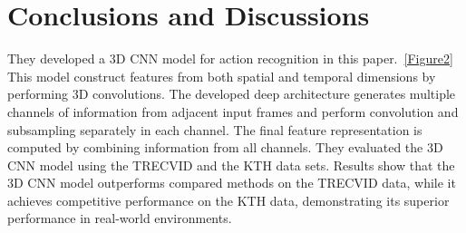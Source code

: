 \documentclass[10pt,twocolumn,letterpaper]{article}
\begin{document}
\section{Conclusions and Discussions}
They developed a 3D CNN model for action recognition in this paper.~\ref{Figure2} This model construct features from both spatial and temporal dimensions by performing 3D convolutions. The developed deep architecture generates multiple channels of information from adjacent input frames and perform convolution and subsampling separately in each channel. The final feature representation is computed by combining information from all channels. They evaluated the 3D CNN model using the TRECVID and the KTH data sets. Results show that the 3D CNN model outperforms compared methods on the TRECVID data, while it achieves competitive performance on the KTH data, demonstrating its superior performance in real-world environments.


\end{document}
